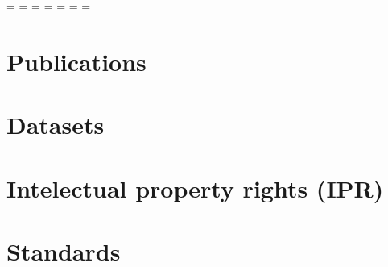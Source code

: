 
\setcounter{chapter}{0}
\setcounter{figure}{0}




\newpage
\setparttableofcontents
\parttoc %


\partlof %


\partlot %
\newpage






\newpage
\paperwidth=\pdfpageheight
\paperheight=\pdfpagewidth
\pdfpageheight=\paperheight
\pdfpagewidth=\paperwidth
\headwidth=\textheight
\begingroup
    \vsize=\textwidth
    \hsize=\textheight







\section{Publications}

\section{Datasets}

\section{Intelectual property rights (IPR)}

\section{Standards}

